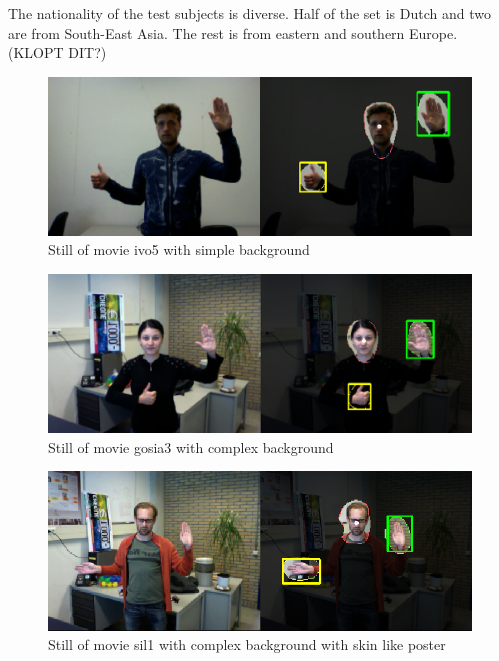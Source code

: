 The nationality of the test subjects is diverse. Half of the set is Dutch and two are from South-East Asia. The rest is from eastern and southern Europe. (KLOPT DIT?)

\begin{figure}[tb]
\center{}
\includegraphics[width=0.8\linewidth]{figures/simple.png}
\caption{Still of movie ivo5 with simple background}
\label{fig:simplebackground}
\end{figure}

\begin{figure}[tb]
\center{}
\includegraphics[width=0.8\linewidth]{figures/complex.png}
\caption{Still of movie gosia3 with complex background}
\label{fig:complexbackground}
\end{figure}

\begin{figure}[tb]
\center{}
\includegraphics[width=0.8\linewidth]{figures/complexposter.png}
\caption{Still of movie sil1 with complex background with skin like poster}
\label{fig:complexposterbackground}
\end{figure}


